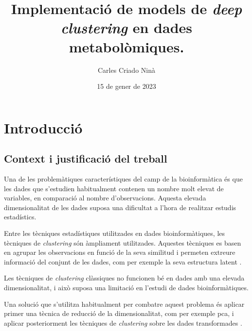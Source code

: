 \documentclass[CAT,BIB]{TFUOC}%
\title{Implementació de models de \textit{deep clustering} en dades metabolòmiques.}
\author{Carles Criado Ninà}
\date{15 de gener de 2023}
\begin{document}
\estructura

\tableofcontents

\listoffigures

\listoftables




\chapter{Introducció}
\label{s:intro}

    \section{Context i justificació del treball}
    \label{s:contect}

        Una de les problemàtiques característiques
        del camp de la bioinformàtica
        és que les dades que s'estudien
        habitualment contenen un nombre molt elevat de variables,
        en comparació al nombre d'observacions.
        Aquesta elevada dimensionalitat de les dades
        suposa una dificultat a l'hora de realitzar estudis estadístics.

        Entre les tècniques estadístiques
        utilitzades en dades bioinformàtiques,
        les tècniques de \textit{clustering}
        són àmpliament utilitzades.
        Aquestes tècniques es basen en agrupar les observacions
        en funció de la seva similitud
        i permeten extreure informació del conjunt de les dades,
        com per exemple la seva estructura latent \citep{Karim2021, Masood2015}.

        Les tècniques de \textit{clustering} clàssiques
        no funcionen bé en dades amb una elevada dimensionalitat,
        i això suposa una limitació en l'estudi de dades bioinformàtiques.

        Una solució que s'utilitza habitualment
        per combatre aquest problema
        és aplicar primer una tècnica de reducció de la dimensionalitat,
        com per exemple \gls{pca},
        i aplicar posteriorment les tècniques de \textit{clustering}
        sobre les dades transformades \citep{Min2018, Masood2015}.
\end{document}
